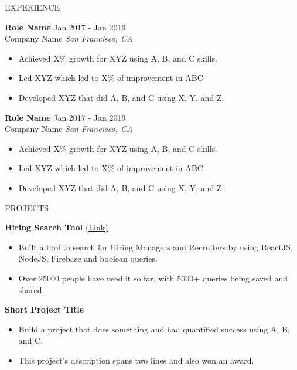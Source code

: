 \documentclass{resume} %
\begin{document}
\begin{rSection}{EXPERIENCE}

\textbf{Role Name} \hfill Jan 2017 - Jan 2019\\
Company Name \hfill \textit{San Francisco, CA}
 \begin{itemize}
    \itemsep -3pt {}
     \item Achieved X\% growth for XYZ using A, B, and C skills.
     \item Led XYZ which led to X\% of improvement in ABC
    \item Developed XYZ that did A, B, and C using X, Y, and Z.
 \end{itemize}

\textbf{Role Name} \hfill Jan 2017 - Jan 2019\\
Company Name \hfill \textit{San Francisco, CA}
 \begin{itemize}
    \itemsep -3pt {}
     \item Achieved X\% growth for XYZ using A, B, and C skills.
     \item Led XYZ which led to X\% of improvement in ABC
    \item Developed XYZ that did A, B, and C using X, Y, and Z.
 \end{itemize}

\end{rSection} 


\begin{rSection}{PROJECTS}

\textbf{Hiring Search Tool} \hfill \href{https://hiring-search.careerflow.ai/}{(Link)}
 \begin{itemize}
    \itemsep -3pt {}
     \item Built a tool to search for Hiring Managers and Recruiters by using ReactJS, NodeJS, Firebase and boolean queries.
     \item Over 25000 people have used it so far, with 5000+ queries being saved and shared.
 \end{itemize}

\textbf{Short Project Title}
 \begin{itemize}
    \itemsep -3pt {}
     \item Build a project that does something and had quantified success using A, B, and C.
     \item This project's description spans two lines and also won an award.
 \end{itemize}

\end{rSection}
\end{document}

